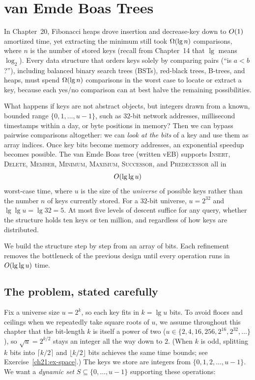 \chapter{van Emde Boas Trees}

In Chapter~20, Fibonacci heaps drove insertion and decrease-key down to $O(1)$ amortized time, yet extracting the minimum still took $\Omega(\lg n)$ comparisons, where $n$ is the number of stored keys (recall from Chapter~14 that $\lg$ means $\log_2$). Every data structure that orders keys solely by comparing pairs (``is $a < b$?''), including balanced binary search trees (BSTs), red-black trees, B-trees, and heaps, must spend $\Omega(\lg n)$ comparisons in the worst case to locate or extract a key, because each yes/no comparison can at best halve the remaining possibilities.

What happens if keys are not abstract objects, but integers drawn from a known, bounded range $\{0, 1, \dots, u-1\}$, such as $32$-bit network addresses, millisecond timestamps within a day, or byte positions in memory? Then we can bypass pairwise comparisons altogether: we can \emph{look at the bits} of a key and use them as array indices. Once key bits become memory addresses, an exponential speedup becomes possible. The van Emde Boas tree (written vEB) supports
\textsc{Insert}, \textsc{Delete}, \textsc{Member}, \textsc{Minimum},
\textsc{Maximum}, \textsc{Successor}, and \textsc{Predecessor} all in
\[
  O(\lg \lg u)
\]
worst-case time, where $u$ is the size of the \emph{universe} of possible keys rather than the
number $n$ of keys currently stored. For a $32$-bit universe,
$u = 2^{32}$ and $\lg\lg u = \lg 32 = 5$. At most five levels of descent
suffice for any query, whether the structure holds ten keys or ten
million, and regardless of how keys are distributed.

We build the structure step by step from an array of bits. Each refinement removes the bottleneck of the previous design until every operation runs in $O(\lg\lg u)$ time.

\chapterline

\section{The problem, stated carefully}

Fix a universe size $u = 2^k$, so each key fits in $k = \lg u$ bits. To avoid floors and ceilings when we repeatedly take square roots of $u$, we assume throughout this chapter that the bit-length $k$ is itself a power of two ($u \in \{2, 4, 16, 256, 2^{16}, 2^{32}, \dots\}$), so $\sqrt{u} = 2^{k/2}$ stays an integer all the way down to $2$. (When $k$ is odd, splitting $k$ bits into $\lceil k/2 \rceil$ and $\lfloor k/2 \rfloor$ bits achieves the same time bounds; see Exercise~\ref{ch21:ex-space}.) The keys we store are integers from
$\{0, 1, 2, \dots, u-1\}$. We want a \emph{dynamic set} $S \subseteq
\{0,\dots,u-1\}$ supporting these operations:

